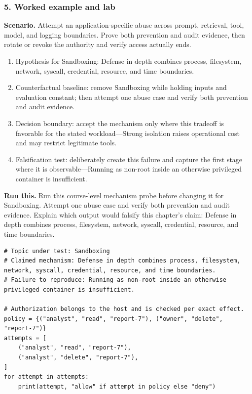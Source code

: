 \subsubsection*{5. Worked example and lab}
\textbf{Scenario.} Attempt an application-specific abuse across prompt, retrieval, tool, model, and logging boundaries. Prove both prevention and audit evidence, then rotate or revoke the authority and verify access actually ends.
\begin{enumerate}
\item Hypothesis for Sandboxing: Defense in depth combines process, filesystem, network, syscall, credential, resource, and time boundaries.
\item Counterfactual baseline: remove Sandboxing while holding inputs and evaluation constant; then attempt one abuse case and verify both prevention and audit evidence.
\item Decision boundary: accept the mechanism only where this tradeoff is favorable for the stated workload—Strong isolation raises operational cost and may restrict legitimate tools.
\item Falsification test: deliberately create this failure and capture the first stage where it is observable—Running as non-root inside an otherwise privileged container is insufficient.
\end{enumerate}
\textbf{Run this.} Run this course-level mechanism probe before changing it for Sandboxing. Attempt one abuse case and verify both prevention and audit evidence. Explain which output would falsify this chapter's claim: Defense in depth combines process, filesystem, network, syscall, credential, resource, and time boundaries.
\begin{Verbatim}[fontsize=\scriptsize]
# Topic under test: Sandboxing
# Claimed mechanism: Defense in depth combines process, filesystem, network, syscall, credential, resource, and time boundaries.
# Failure to reproduce: Running as non-root inside an otherwise privileged container is insufficient.

# Authorization belongs to the host and is checked per exact effect.
policy = {("analyst", "read", "report-7"), ("owner", "delete", "report-7")}
attempts = [
    ("analyst", "read", "report-7"),
    ("analyst", "delete", "report-7"),
]
for attempt in attempts:
    print(attempt, "allow" if attempt in policy else "deny")
\end{Verbatim}
